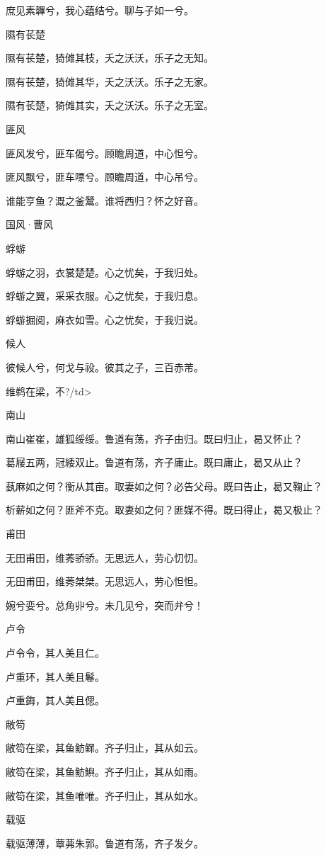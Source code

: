 庶见素韠兮，我心蕴结兮。聊与子如一兮。

隰有苌楚

隰有苌楚，猗傩其枝，夭之沃沃，乐子之无知。

隰有苌楚，猗傩其华，夭之沃沃。乐子之无家。

隰有苌楚，猗傩其实，夭之沃沃。乐子之无室。

匪风

匪风发兮，匪车偈兮。顾瞻周道，中心怛兮。

匪风飘兮，匪车嘌兮。顾瞻周道，中心吊兮。

谁能亨鱼？溉之釜鬵。谁将西归？怀之好音。




国风·曹风


蜉蝣

蜉蝣之羽，衣裳楚楚。心之忧矣，于我归处。

蜉蝣之翼，采采衣服。心之忧矣，于我归息。

蜉蝣掘阅，麻衣如雪。心之忧矣，于我归说。

候人

彼候人兮，何戈与祋。彼其之子，三百赤芾。

维鹈在梁，不?/td> 

南山

南山崔崔，雄狐绥绥。鲁道有荡，齐子由归。既曰归止，曷又怀止？

葛屦五两，冠緌双止。鲁道有荡，齐子庸止。既曰庸止，曷又从止？

蓺麻如之何？衡从其亩。取妻如之何？必告父母。既曰告止，曷又鞠止？

析薪如之何？匪斧不克。取妻如之何？匪媒不得。既曰得止，曷又极止？

甫田

无田甫田，维莠骄骄。无思远人，劳心忉忉。

无田甫田，维莠桀桀。无思远人，劳心怛怛。

婉兮娈兮。总角丱兮。未几见兮，突而弁兮！

卢令

卢令令，其人美且仁。

卢重环，其人美且鬈。

卢重鋂，其人美且偲。

敝笱

敝笱在梁，其鱼鲂鳏。齐子归止，其从如云。

敝笱在梁，其鱼鲂鱮。齐子归止，其从如雨。

敝笱在梁，其鱼唯唯。齐子归止，其从如水。

载驱

载驱薄薄，蕈茀朱郭。鲁道有荡，齐子发夕。

